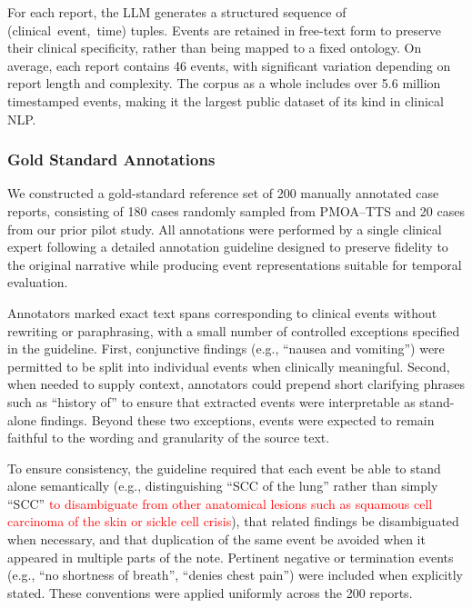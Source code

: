 \documentclass[pdflatex,sn-mathphys-num]{sn-jnl}%
\newcommand{\jeremy}[1]{\textcolor{red}{#1}}
\theoremstyle{thmstyleone}%
\theoremstyle{thmstyletwo}%
\theoremstyle{thmstylethree}%
\begin{document}
%

For each report, the LLM generates a structured sequence of \mbox{(clinical event, time)} tuples. Events are retained in free-text form to preserve their clinical specificity, rather than being mapped to a fixed ontology. On average, each report contains 46 events, with significant variation depending on report length and complexity. The corpus as a whole includes over 5.6 million timestamped events, making it the largest public dataset of its kind in clinical NLP. 

\subsubsection{Gold Standard Annotations}
\label{sec:gold-standard-annotations}

We constructed a gold-standard reference set of 200 manually annotated case reports, consisting of 180 cases randomly sampled from PMOA–TTS and 20 cases from our prior pilot study. All annotations were performed by a single clinical expert following a detailed annotation guideline designed to preserve fidelity to the original narrative while producing event representations suitable for temporal evaluation.

Annotators marked exact text spans corresponding to clinical events without rewriting or paraphrasing, with a small number of controlled exceptions specified in the guideline. First, conjunctive findings (e.g., “nausea and vomiting”) were permitted to be split into individual events when clinically meaningful. Second, when needed to supply context, annotators could prepend short clarifying phrases such as “history of” to ensure that extracted events were interpretable as stand-alone findings. Beyond these two exceptions, events were expected to remain faithful to the wording and granularity of the source text.

To ensure consistency, the guideline required that each event be able to stand alone semantically (e.g., distinguishing “SCC of the lung” rather than simply “SCC” \jeremy{to disambiguate from other anatomical lesions such as squamous cell carcinoma of the skin or sickle cell crisis}), that related findings be disambiguated when necessary, and that duplication of the same event be avoided when it appeared in multiple parts of the note. Pertinent negative or termination events (e.g., “no shortness of breath”, “denies chest pain”) were included when explicitly stated. These conventions were applied uniformly across the 200 reports.
\end{document}
